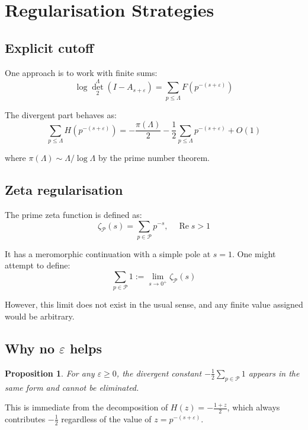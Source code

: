 \documentclass[11pt,a4paper]{article}
\newtheorem{proposition}[theorem]{Proposition}
\theoremstyle{definition}
\theoremstyle{remark}
\newcommand{\calP}{\mathcal{P}}
\DeclareMathOperator{\det}{det}
\DeclareMathOperator{\Re}{Re}
\begin{document}
\section{Regularisation Strategies}\label{sec:regularisation}

\subsection{Explicit cutoff}

One approach is to work with finite sums:
\[
\log \det_2^\Lambda(I - A_{s+\varepsilon}) = \sum_{p \leq \Lambda} F(p^{-(s+\varepsilon)})
\]

The divergent part behaves as:
\[
\sum_{p \leq \Lambda} H(p^{-(s+\varepsilon)}) = -\frac{\pi(\Lambda)}{2} - \frac{1}{2}\sum_{p \leq \Lambda} p^{-(s+\varepsilon)} + O(1)
\]

where $\pi(\Lambda) \sim \Lambda/\log \Lambda$ by the prime number theorem.

\subsection{Zeta regularisation}

The prime zeta function is defined as:
\[
\zeta_{\calP}(s) = \sum_{p \in \calP} p^{-s}, \quad \Re s > 1
\]

It has a meromorphic continuation with a simple pole at $s = 1$. One might attempt to define:
\[
\sum_{p \in \calP} 1 := \lim_{s \to 0^+} \zeta_{\calP}(s)
\]

However, this limit does not exist in the usual sense, and any finite value assigned 
would be arbitrary.

\subsection{Why no $\varepsilon$ helps}

\begin{proposition}
For any $\varepsilon \geq 0$, the divergent constant $-\frac{1}{2}\sum_{p \in \calP} 1$ 
appears in the same form and cannot be eliminated.
\end{proposition}

This is immediate from the decomposition of $H(z) = -\frac{1+z}{2}$, which always 
contributes $-\frac{1}{2}$ regardless of the value of $z = p^{-(s+\varepsilon)}$.

\end{document}
